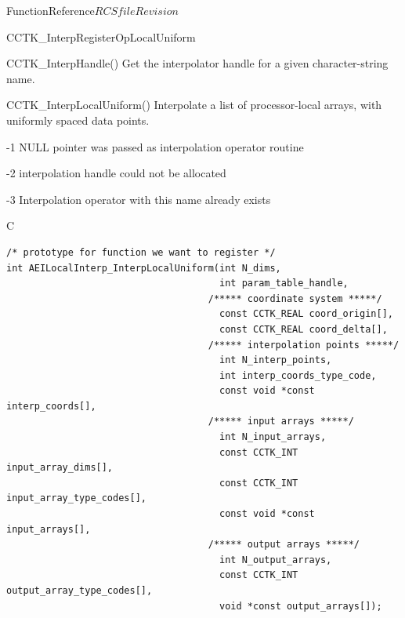 \begin{cactuspart}{FunctionReference}{$RCSfile$}{$Revision$}
\begin{FunctionDescription}{CCTK\_InterpRegisterOpLocalUniform}
\begin{SeeAlsoSection}
\begin{SeeAlso}{CCTK\_InterpHandle()}
Get the interpolator handle for a given character-string name.
\end{SeeAlso}
\begin{SeeAlso}{CCTK\_InterpLocalUniform()}
Interpolate a list of processor-local arrays, with uniformly spaced
data points.
\end{SeeAlso}
\end{SeeAlsoSection}

\begin{ErrorSection}
\begin{Error}{-1}
NULL pointer was passed as interpolation operator routine
\end{Error}
\begin{Error}{-2}
interpolation handle could not be allocated
\end{Error}
\begin{Error}{-3}
Interpolation operator with this name already exists
\end{Error}
\end{ErrorSection}

\begin{ExampleSection}
\begin{Example}{C}
\begin{verbatim}
/* prototype for function we want to register */
int AEILocalInterp_InterpLocalUniform(int N_dims,
                                      int param_table_handle,
                                    /***** coordinate system *****/
                                      const CCTK_REAL coord_origin[],
                                      const CCTK_REAL coord_delta[],
                                    /***** interpolation points *****/
                                      int N_interp_points,
                                      int interp_coords_type_code,
                                      const void *const interp_coords[],
                                    /***** input arrays *****/
                                      int N_input_arrays,
                                      const CCTK_INT input_array_dims[],
                                      const CCTK_INT input_array_type_codes[],
                                      const void *const input_arrays[],
                                    /***** output arrays *****/
                                      int N_output_arrays,
                                      const CCTK_INT output_array_type_codes[],
                                      void *const output_arrays[]);


\end{verbatim}
\end{Example}
\end{ExampleSection}
\end{FunctionDescription}
\end{cactuspart}

